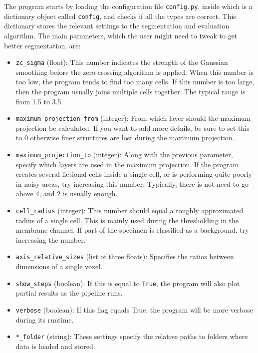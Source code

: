 \documentclass[
  digital,     %
  oneside,     %
  nosansbold,  %
  nocolorbold, %
  lof,         %
  lot,         %
]{fithesis4}
\begin{document}
The program starts by loading the configuration file \texttt{config.py}, inside
which is a dictionary object called \texttt{config}, and checks if all the types are
correct. This dictionary stores the
relevant settings to the segmentation and evaluation algorithm. The main parameters, which the
user might need to tweak to get better segmentation, are:
\begin{itemize}
    \item \texttt{zc\_sigma} (float): This number indicates the strength of the
        Gaussian smoothing before the zero-crossing algorithm is applied. When this
        number is too low, the program tends to find too many cells. If this number is 
        too large, then the program usually joins multiple cells together. The typical
        range is from 1.5 to 3.5.
    \item \texttt{maximum\_projection\_from} (integer): From which layer should
        the maximum projection be calculated. If you want to add more details, be sure
        to set this to 0 otherwise finer structures are lost during the maximum
        projection.
    \item \texttt{maximum\_projection\_to} (integer): Along with the previous
        parameter, specify which layers are used in the maximum projection. If the
        program creates several fictional cells inside a single cell, or is performing
        quite poorly in noisy areas, try increasing this number. Typically, there
        is not need to go above 4, and 2 is usually enough.
    \item \texttt{cell\_radius} (integer): This number should equal a roughly
        approximated radius of a single cell. This is mainly used during the
        thresholding in the membrane channel. If part of the specimen is
        classified as a background, try increasing the number.
    \item \texttt{axis\_relative\_sizes} (list of three floats): Specifies the
        ratios between dimensions of a single voxel.
    \item \texttt{show\_steps} (boolean): If this is equal to \texttt{True},
        the program will also plot partial results as the pipeline runs.
    \item \texttt{verbose} (boolean): If this flag equals True, the program
        will be more verbose during its runtime.
    \item \texttt{*\_folder} (string): These settings specify the relative paths
        to folders where data is loaded and stored.
\end{itemize}
\end{document}
